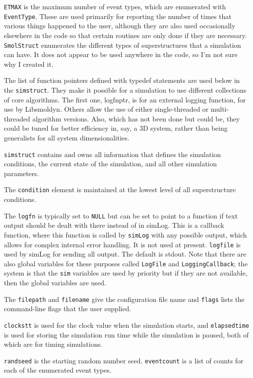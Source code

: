 \documentclass {scrbook}
\newcommand {\ttt} {\texttt}
\begin{document}
\ttt{ETMAX} is the maximum number of event types, which are enumerated with \ttt{EventType}. These are used primarily for reporting the number of times that various things happened to the user, although they are also used occasionally elsewhere in the code so that certain routines are only done if they are necessary. \ttt{SmolStruct} enumerates the different types of superstructures that a simulation can have. It does not appear to be used anywhere in the code, so I'm not sure why I created it.

The list of function pointers defined with typedef statements are used below in the \ttt{simstruct}. They make it possible for a simulation to use different collections of core algorithms. The first one, logfnptr, is for an external logging function, for use by Libsmoldyn. Others allow the use of either single-threaded or multi-threaded algorithm versions. Also, which has not been done but could be, they could be tuned for better efficiency in, say, a 3D system, rather than being generalists for all system dimensionalities.

\ttt{simstruct} contains and owns all information that defines the simulation conditions, the current state of the simulation, and all other simulation parameters.

The \ttt{condition} element is maintained at the lowest level of all superstructure conditions.

The \ttt{logfn} is typically set to \ttt{NULL} but can be set to point to a function if text output should be dealt with there instead of in simLog. This is a callback function, where this function is called by \ttt{simLog} with any possible output, which allows for complex internal error handling. It is not used at present. \ttt{logfile} is used by simLog for sending all output. The default is stdout. Note that there are also global variables for these purposes called \ttt{LogFile} and \ttt{LoggingCallback}; the system is that the \ttt{sim} variables are used by priority but if they are not available, then the global variables are used.

The \ttt{filepath} and \ttt{filename} give the configuration file name and \ttt{flags} lists the command-line flags that the user supplied.

\ttt{clockstt} is used for the clock value when the simulation starts, and \ttt{elapsedtime} is used for storing the simulation run time while the simulation is paused, both of which are for timing simulations.

\ttt{randseed} is the starting random number seed. \ttt{eventcount} is a list of counts for each of the enumerated event types.
\end{document}
